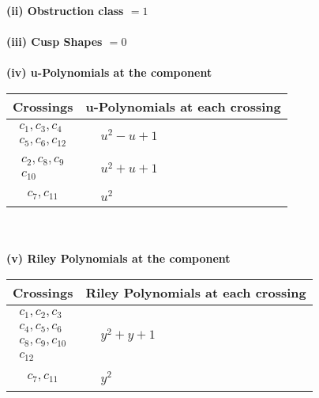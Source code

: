 \documentclass[1p]{elsarticle_modified}
\theoremstyle{definition}
\begin{document}
\flushleft \textbf{(ii) Obstruction class $= 1$}\\~\\
\flushleft \textbf{(iii) Cusp Shapes $= 0$}\\~\\
\newpage\renewcommand{\arraystretch}{1}
\flushleft \textbf{(iv) u-Polynomials at the component}\newline \\
\begin{tabular}{m{50pt}|m{274pt}}
Crossings & \hspace{64pt}u-Polynomials at each crossing \\
\hline $$\begin{aligned}c_{1},c_{3},c_{4}\\c_{5},c_{6},c_{12}\end{aligned}$$&$\begin{aligned}
&u^2- u+1
\end{aligned}$\\
\hline $$\begin{aligned}c_{2},c_{8},c_{9}\\c_{10}\end{aligned}$$&$\begin{aligned}
&u^2+u+1
\end{aligned}$\\
\hline $$\begin{aligned}c_{7},c_{11}\end{aligned}$$&$\begin{aligned}
&u^2
\end{aligned}$\\
\hline
\end{tabular}\\~\\
\newpage\renewcommand{\arraystretch}{1}
\flushleft \textbf{(v) Riley Polynomials at the component}\newline \\
\begin{tabular}{m{50pt}|m{274pt}}
Crossings & \hspace{64pt}Riley Polynomials at each crossing \\
\hline $$\begin{aligned}c_{1},c_{2},c_{3}\\c_{4},c_{5},c_{6}\\c_{8},c_{9},c_{10}\\c_{12}\end{aligned}$$&$\begin{aligned}
&y^2+y+1
\end{aligned}$\\
\hline $$\begin{aligned}c_{7},c_{11}\end{aligned}$$&$\begin{aligned}
&y^2
\end{aligned}$\\
\hline
\end{tabular}\\~\\
\end{document}
